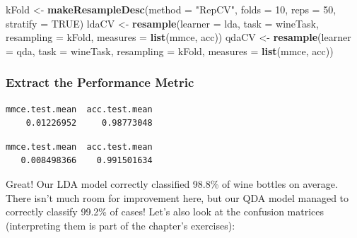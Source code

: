 \documentclass[
]{article}
\newenvironment{Shaded}{\begin{snugshade}}{\end{snugshade}}
\newcommand{\AttributeTok}[1]{\textcolor[rgb]{0.13,0.29,0.53}{#1}}
\newcommand{\ConstantTok}[1]{\textcolor[rgb]{0.56,0.35,0.01}{#1}}
\newcommand{\DecValTok}[1]{\textcolor[rgb]{0.00,0.00,0.81}{#1}}
\newcommand{\FunctionTok}[1]{\textcolor[rgb]{0.13,0.29,0.53}{\textbf{#1}}}
\newcommand{\NormalTok}[1]{#1}
\newcommand{\OtherTok}[1]{\textcolor[rgb]{0.56,0.35,0.01}{#1}}
\newcommand{\SpecialCharTok}[1]{\textcolor[rgb]{0.81,0.36,0.00}{\textbf{#1}}}
\newcommand{\StringTok}[1]{\textcolor[rgb]{0.31,0.60,0.02}{#1}}
\begin{document}
\begin{Shaded}
\begin{Highlighting}[]
\NormalTok{kFold }\OtherTok{\textless{}{-}} \FunctionTok{makeResampleDesc}\NormalTok{(}\AttributeTok{method =} \StringTok{"RepCV"}\NormalTok{, }\AttributeTok{folds =} \DecValTok{10}\NormalTok{, }\AttributeTok{reps =} \DecValTok{50}\NormalTok{,}
\AttributeTok{stratify =} \ConstantTok{TRUE}\NormalTok{)}
\NormalTok{ldaCV }\OtherTok{\textless{}{-}} \FunctionTok{resample}\NormalTok{(}\AttributeTok{learner =}\NormalTok{ lda, }\AttributeTok{task =}\NormalTok{ wineTask, }\AttributeTok{resampling =}\NormalTok{ kFold,}
                  \AttributeTok{measures =} \FunctionTok{list}\NormalTok{(mmce, acc))}
\NormalTok{qdaCV }\OtherTok{\textless{}{-}} \FunctionTok{resample}\NormalTok{(}\AttributeTok{learner =}\NormalTok{ qda, }\AttributeTok{task =}\NormalTok{ wineTask, }\AttributeTok{resampling =}\NormalTok{ kFold,}
                  \AttributeTok{measures =} \FunctionTok{list}\NormalTok{(mmce, acc))}
\end{Highlighting}
\end{Shaded}

\subsubsection{Extract the Performance
Metric}\label{extract-the-performance-metric}

\begin{Shaded}
\end{Shaded}

\begin{verbatim}
mmce.test.mean  acc.test.mean 
    0.01226952     0.98773048 
\end{verbatim}

\begin{Shaded}
\end{Shaded}

\begin{verbatim}
mmce.test.mean  acc.test.mean 
   0.008498366    0.991501634 
\end{verbatim}

Great! Our LDA model correctly classified 98.8\% of wine bottles on
average. There isn't much room for improvement here, but our QDA model
managed to correctly classify 99.2\% of cases! Let's also look at the
confusion matrices (interpreting them is part of the chapter's
exercises):
\end{document}
